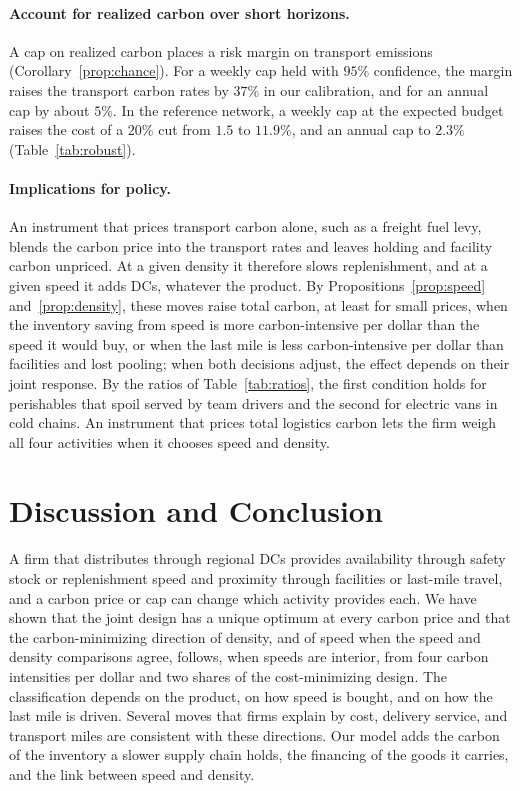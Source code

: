 \documentclass[11pt]{article}
\numberwithin{proposition}{section}
\theoremstyle{definition}
\theoremstyle{remark}
\theoremstyle{plain}
\begin{document}
\paragraph{Account for realized carbon over short horizons.} A cap on realized carbon places
a risk margin on transport emissions (Corollary~\ref{prop:chance}). For a weekly cap held with $95\%$
confidence, the margin raises the transport carbon rates by $37\%$ in our calibration, and for an annual cap by
about $5\%$. In the
reference network, a weekly cap at the expected budget raises the cost of a $20\%$ cut from $1.5$ to $11.9\%$, and
an annual cap to $2.3\%$ (Table~\ref{tab:robust}).

\paragraph{Implications for policy.} An instrument that prices transport carbon alone, such as a freight fuel
levy, blends the carbon price into the transport rates and leaves holding and
facility carbon unpriced. At a given density it therefore slows replenishment, and at a given speed it adds DCs, whatever
the product. By Propositions~\ref{prop:speed} and~\ref{prop:density}, these moves raise total carbon, at least
for small prices, when the inventory saving from speed is more carbon-intensive per dollar than the speed it would
buy, or when the last mile is less carbon-intensive per dollar than facilities and lost pooling; when both
decisions adjust, the effect depends on their joint response. By the ratios of Table~\ref{tab:ratios}, the first
condition holds for perishables that spoil served by team drivers and the second for electric vans in cold
chains. An instrument that prices total logistics carbon lets the firm weigh all four activities when it
chooses speed and density.

\section{Discussion and Conclusion}\label{sec:discussion}

A firm that distributes through regional DCs provides availability through safety stock or
replenishment speed and proximity through facilities or last-mile travel, and a carbon price or cap can change
which activity provides each. We have shown that the joint design has a unique optimum at every carbon price and that the carbon-minimizing
direction of density, and of speed when the speed and density comparisons agree, follows, when speeds are interior, from four
carbon intensities per dollar and two shares of the cost-minimizing design. The classification depends on the product, on how
speed is bought, and on how the last mile is driven. Several moves that firms explain by cost, delivery
service, and transport miles are consistent with these directions. Our model adds the carbon of the inventory a slower supply chain holds, the
financing of the goods it carries, and the link between speed and density.
\end{document}
